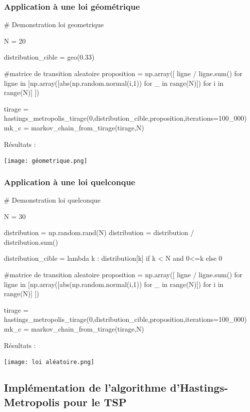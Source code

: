 \documentclass{article}
\begin{document}
\newpage
\subsubsection{Application à une loi géométrique}

\begin{center}
\begin{python}
# Demonstration loi geometrique

N = 20

distribution_cible = geo(0.33)

#matrice de transition aleatoire
proposition = np.array([ ligne / ligne.sum()
    for ligne in [np.array([abs(np.random.normal(i,1)) for _ in range(N)]) for i in range(N)]
])

tirage = hastings_metropolis_tirage(0,distribution_cible,proposition,iterations=100_000)
mk_c = markov_chain_from_tirage(tirage,N)
\end{python}
\end{center}
Résultats :

\texttt{[image: géometrique.png]}

\newpage
\subsubsection{Application à une loi quelconque}

\begin{center}
\begin{python}
# Demonstration loi quelconque

N = 30

distribution = np.random.rand(N)
distribution = distribution / distribution.sum()

distribution_cible = lambda k : distribution[k] if k < N and 0<=k else 0

#matrice de transition aleatoire
proposition = np.array([ ligne / ligne.sum()
    for ligne in [np.array([abs(np.random.normal(i,1)) for _ in range(N)]) for i in range(N)]
])

tirage = hastings_metropolis_tirage(0,distribution_cible,proposition,iterations=100_000)
mk_c = markov_chain_from_tirage(tirage,N)
\end{python}
\end{center}
Résultats :

\texttt{[image: loi aléatoire.png]}

\newpage
\subsection{Implémentation de l'algorithme d'Hastings-Metropolis pour le TSP}
\end{document}
